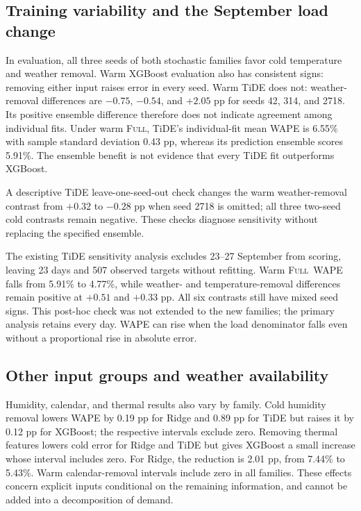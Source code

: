 \documentclass[conference]{IEEEtran}
\newcommand{\full}{\textsc{Full}}
\begin{document}
\subsection{Training variability and the September load change}
In evaluation, all three seeds of both stochastic families favor cold temperature and weather removal. Warm XGBoost evaluation also has consistent signs: removing either input raises error in every seed. Warm TiDE does not: weather-removal differences are $-0.75$, $-0.54$, and $+2.05$ pp for seeds 42, 314, and 2718. Its positive ensemble difference therefore does not indicate agreement among individual fits. Under warm \full, TiDE's individual-fit mean WAPE is 6.55\% with sample standard deviation 0.43 pp, whereas its prediction ensemble scores 5.91\%. The ensemble benefit is not evidence that every TiDE fit outperforms XGBoost.

A descriptive TiDE leave-one-seed-out check changes the warm weather-removal contrast from $+0.32$ to $-0.28$ pp when seed 2718 is omitted; all three two-seed cold contrasts remain negative. These checks diagnose sensitivity without replacing the specified ensemble.

The existing TiDE sensitivity analysis excludes 23--27 September from scoring, leaving 23 days and 507 observed targets without refitting. Warm \full\ WAPE falls from 5.91\% to 4.77\%, while weather- and temperature-removal differences remain positive at $+0.51$ and $+0.33$ pp. All six contrasts still have mixed seed signs. This post-hoc check was not extended to the new families; the primary analysis retains every day. WAPE can rise when the load denominator falls even without a proportional rise in absolute error.

\subsection{Other input groups and weather availability}
Humidity, calendar, and thermal results also vary by family. Cold humidity removal lowers WAPE by 0.19 pp for Ridge and 0.89 pp for TiDE but raises it by 0.12 pp for XGBoost; the respective intervals exclude zero. Removing thermal features lowers cold error for Ridge and TiDE but gives XGBoost a small increase whose interval includes zero. For Ridge, the reduction is 2.01 pp, from 7.44\% to 5.43\%. Warm calendar-removal intervals include zero in all families. These effects concern explicit inputs conditional on the remaining information, and cannot be added into a decomposition of demand.
\end{document}

